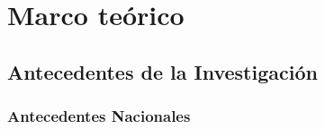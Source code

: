 
\chapter{Marco teórico}

\section{Antecedentes de la Investigación}

\subsection{Antecedentes Nacionales}

